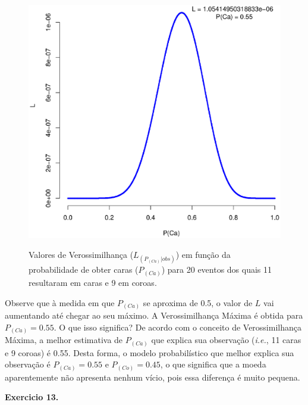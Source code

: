 \begin{refsection}
  \begin{figure}[h!]
       \centering
      {\includegraphics[scale=0.55]{figures/tut12/plot_1.eps}}
      {\caption{Valores de Verossimilhança ($L_{(P_{(Ca)}|obs)}$) em função da probabilidade de obter caras ($P_{(Ca)}$) para 20 eventos dos quais 11 resultaram em caras e 9 em coroas.}\label{fig:plot1}}
  \end{figure}


Observe que à medida em que $P_{(Ca)}$ se aproxima de 0.5, o valor de $L$ vai aumentando até chegar ao seu máximo. A Verossimilhança Máxima é obtida para $P_{(Ca)} = 0.55$. O que isso significa? De acordo com o conceito de Verossimilhança Máxima, a melhor estimativa de $P_{(Ca)}$ que explica sua observação (\textit{i.e.}, 11 caras e 9 coroas) é 0.55. Desta forma, o modelo probabilístico que melhor explica sua observação é $P_{(Ca)} = 0.55$ e $P_{(Co)} = 0.45$, o que significa que a moeda aparentemente não apresenta nenhum vício, pois essa diferença é muito pequena.\\

\begin{blackBlock}{\textbf{Exercicio 13.}}\label{tut12:ex:13.1}


\end{blackBlock}
\end{refsection}
